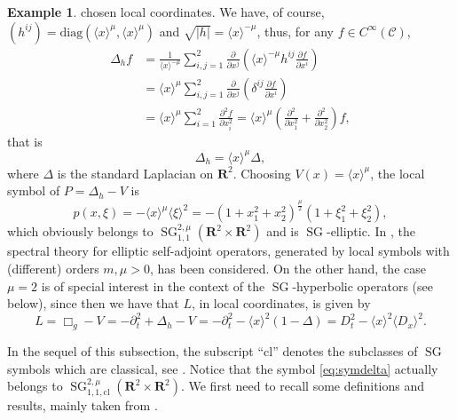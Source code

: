 \documentclass[12pt,a4paper,reqno]{amsart}
\numberwithin{equation}{section}
\numberwithin{thm}{section}
\theoremstyle{definition}
\newtheorem{example}[thm]{Example}
\theoremstyle{remark}
\begin{document}
\begin{example}
chosen local coordinates. We have, of course, $(h^{ij}) = \mathrm{diag}({\langle {x} \rangle}^\mu,{\langle {x} \rangle}^\mu)$
and $\sqrt{|h|} = {\langle {x} \rangle}^{-\mu} $, thus, for any $f \in C^\infty({\mathcal{C}})$,
\begin{equation*}
\begin{split}
\Delta_h f & = \frac{1}{{\langle {x} \rangle}^{-\mu}} \sum_{i,j = 1}^2 \frac{\partial}{\partial x^j} \left( {\langle {x} \rangle}^{-\mu} h^{ij} \frac{\partial f}{\partial x^i}\right) \\
& =  {\langle {x} \rangle}^{\mu} \sum_{i,j=1}^2  \frac{\partial}{\partial x^j} \left( \delta^{ij} \frac{\partial f}{\partial x^i}\right) \\
& = {\langle {x} \rangle}^{\mu} \sum_{i=1}^2  \frac{\partial^2 f}{\partial x_i^2} =  {\langle {x} \rangle}^{\mu} \left( \frac{\partial^2}{\partial x_1^2} + \frac{\partial^2}{\partial x_2^2}\right) f,
\end{split}
\end{equation*}
that is
\begin{equation*}
\Delta_h = {\langle{x}\rangle}^\mu \Delta,
\end{equation*}
where $\Delta$ is the standard Laplacian on ${\mathbf R^{{2}}}$. Choosing $V(x)={\langle{x}\rangle}^\mu$, 
the local symbol of $P=\Delta_h-V$ is
\begin{equation}
\label{eq:symdelta}
p(x,\xi) = - {\langle{x}\rangle}^\mu {\langle{\xi}\rangle}^2 = -(1+x_1^2+x_2^2)^{\frac{\mu}{2}} (1+\xi_1^2 + \xi_2^2),
\end{equation}
which obviously belongs to ${\operatorname{SG}}^{2,\mu}_{1,1}({\mathbf R^{{2}}}\times{\mathbf R^{{2}}})$ and is ${\operatorname{SG}}$-elliptic.
In \cite{CoMa2}, the spectral theory for elliptic self-adjoint operators, generated by local symbols with 
(different) orders $m,\mu>0$, has been considered. On the other hand,
the case $\mu=2$ is of special interest in the context of the ${\operatorname{SG}}$-hyperbolic operators (see below),
since then we have that $L$, in local coordinates, is given by
\[
	L=\Box_g-V=-\partial_t^2+\Delta_h-V=-\partial_t^2-{\langle{x}\rangle}^2(1-\Delta)=D_t^2-{\langle{x}\rangle}^2{\langle{D_x}\rangle}^2.
\]
\end{example}

In the sequel of this subsection, the subscript ``$\mathrm{cl}$'' denotes the subclasses of
${\operatorname{SG}}$ symbols which are classical, see \cite{CoPa}. Notice that the symbol \eqref{eq:symdelta} 
actually belongs to ${\operatorname{SG}}^{2,\mu}_{1,1,\mathrm{cl}}({\mathbf R^{{2}}}\times{\mathbf R^{{2}}})$.
We first need to recall some definitions and results, mainly taken from
\cite{coriasco, coriasco2, CoPa}.
\end{document}

